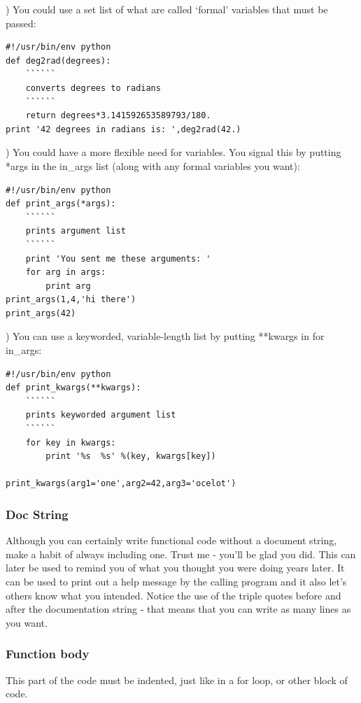 \documentclass[11pt]{book}
\begin{document}
{{)  You could use  a set list of what are called `formal' variables that must be passed:


{ \color{blue} \begin{verbatim}
#!/usr/bin/env python
def deg2rad(degrees):
    ``````
    converts degrees to radians
    ``````
    return degrees*3.141592653589793/180.
print '42 degrees in radians is: ',deg2rad(42.)
\end{verbatim}}

) You could have a more flexible need for variables.  You signal this by putting  *args in the in\_args list (along with any formal variables you want):

{ \color{blue} \begin{verbatim}
#!/usr/bin/env python
def print_args(*args):
    ``````
    prints argument list
    ``````
    print 'You sent me these arguments: '
    for arg in args:
        print arg
print_args(1,4,'hi there')
print_args(42)
\end{verbatim}}

) You can use a keyworded, variable-length list by putting **kwargs in for in\_args:

{ \color{blue} \begin{verbatim}
#!/usr/bin/env python
def print_kwargs(**kwargs):
    ``````
    prints keyworded argument list
    ``````
    for key in kwargs:
        print '%s  %s' %(key, kwargs[key])

print_kwargs(arg1='one',arg2=42,arg3='ocelot')
\end{verbatim}}

 \subsubsection{Doc String}
 Although you can certainly write functional code without a document string, make a habit of always including one.  Trust me - you'll be glad you did.  This can later be used to remind you of what you thought you were doing years later.  It can be used to print out a help message by the calling program and it also let's others know what you intended.   Notice the use of the triple quotes before and after the documentation string - that means that you can write as many lines as you want.

 \subsubsection{Function body}
 This part of the code must be indented, just like in a for loop, or other block of code.

}}
\end{document}
